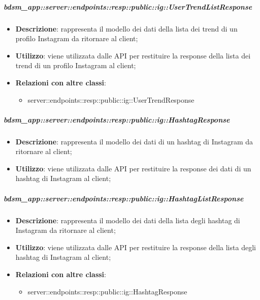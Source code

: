     \subparagraph{bdsm\_app::server::endpoints::resp::public::ig::UserTrendListResponse} %
    \label{subp:bdsm_app_server_endpoints_resp_public_ig_usertrendlistresponse}
    \begin{itemize}
      \item \textbf{Descrizione}: rappresenta il modello dei dati della lista dei trend di un profilo Instagram da ritornare al client;
      \item \textbf{Utilizzo}: viene utilizzata dalle API per restituire la response della lista dei trend di un profilo Instagram al client;
      \item \textbf{Relazioni con altre classi}:
        \begin{itemize}
          \item server::endpoints::resp::public::ig::UserTrendResponse
        \end{itemize}
      \end{itemize}

    \subparagraph{bdsm\_app::server::endpoints::resp::public::ig::HashtagResponse} %
    \label{subp:bdsm_app_server_endpoints_resp_public_ig_hashtagresponse}
    \begin{itemize}
      \item \textbf{Descrizione}: rappresenta il modello dei dati di un hashtag di Instagram da ritornare al client;
      \item \textbf{Utilizzo}: viene utilizzata dalle API per restituire la response dei dati di un hashtag di Instagram al client;
      \end{itemize}

    \subparagraph{bdsm\_app::server::endpoints::resp::public::ig::HashtagListResponse} %
    \label{subp:bdsm_app_server_endpoints_resp_public_ig_hashtaglistresponse}
    \begin{itemize}
      \item \textbf{Descrizione}: rappresenta il modello dei dati della lista degli hashtag di Instagram da ritornare al client;
      \item \textbf{Utilizzo}: viene utilizzata dalle API per restituire la response della lista degli hashtag di Instagram al client;
      \item \textbf{Relazioni con altre classi}:
        \begin{itemize}
          \item server::endpoints::resp::public::ig::HashtagResponse
        \end{itemize}
      \end{itemize}

